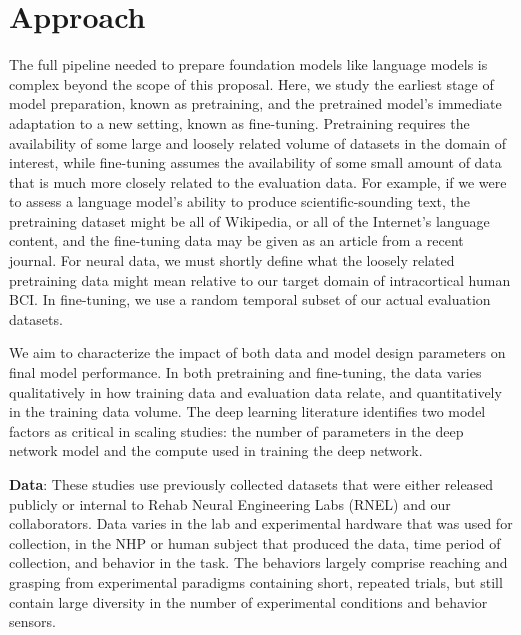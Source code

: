 \documentclass[12pt,oneside]{report}
\begin{document}
\section{Approach}
The full pipeline needed to prepare foundation models like language models is complex beyond the scope of this proposal. Here, we study the earliest stage of model preparation, known as pretraining, and the pretrained model’s immediate adaptation to a new setting, known as fine-tuning. Pretraining requires the availability of some large and loosely related volume of datasets in the domain of interest, while fine-tuning assumes the availability of some small amount of data that is much more closely related to the evaluation data. For example, if we were to assess a language model’s ability to produce scientific-sounding text, the pretraining dataset might be all of Wikipedia, or all of the Internet’s language content, and the fine-tuning data may be given as an article from a recent journal. For neural data, we must shortly define what the loosely related pretraining data might mean relative to our target domain of intracortical human BCI. In fine-tuning, we use a random temporal subset of our actual evaluation datasets.

We aim to characterize the impact of both data and model design parameters on final model performance. In both pretraining and fine-tuning, the data varies qualitatively in how training data and evaluation data relate, and quantitatively in the training data volume. The deep learning literature identifies two model factors as critical in scaling studies: the number of parameters in the deep network model and the compute used in training the deep network.

\textbf{Data}: These studies use previously collected datasets that were either released publicly or internal to Rehab Neural Engineering Labs (RNEL) and our collaborators. Data varies in the lab and experimental hardware that was used for collection, in the NHP or human subject that produced the data, time period of collection, and behavior in the task. The behaviors largely comprise reaching and grasping from experimental paradigms containing short, repeated trials, but still contain large diversity in the number of experimental conditions and behavior sensors.
\end{document}
